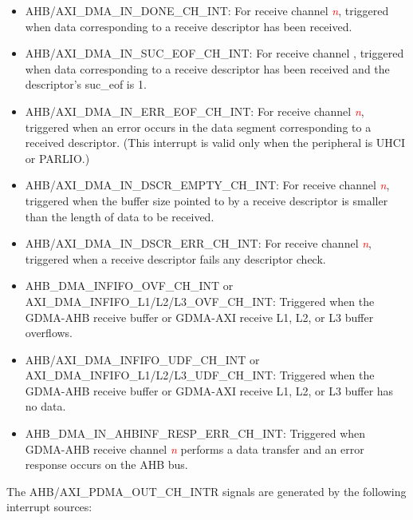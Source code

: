 \documentclass[main\_\_EN.tex]{subfiles}
\begin{document}
\begin{itemize}
    \item \label{int:GDMAINDONEINT}AHB/AXI\_DMA\_IN\_DONE\_CH\_INT: For receive channel \textcolor{red}{\it{n}}, triggered when data corresponding to a receive descriptor has been received.
    \item \label{int:GDMAINSUCEOFINT}AHB/AXI\_DMA\_IN\_SUC\_EOF\_CH\_INT: For receive channel , triggered when data corresponding to a receive descriptor has been received and the descriptor's suc\_eof is 1.
    \item \label{int:GDMAINERREOFINT}AHB/AXI\_DMA\_IN\_ERR\_EOF\_CH\_INT: For receive channel \textcolor{red}{\it{n}}, triggered when an error occurs in the data segment corresponding to a received descriptor. (This interrupt is valid only when the peripheral is UHCI or PARLIO.)
    \item \label{int:GDMAINDSCREMPTYINT}AHB/AXI\_DMA\_IN\_DSCR\_EMPTY\_CH\_INT: For receive channel \textcolor{red}{\it{n}}, triggered when the buffer size pointed to by a receive descriptor is smaller than the length of data to be received.
    \item \label{int:GDMAINDSCRERRINT}AHB/AXI\_DMA\_IN\_DSCR\_ERR\_CH\_INT: For receive channel \textcolor{red}{\it{n}}, triggered when a receive descriptor fails any descriptor check.
    \item \label{int:GDMAINFIFOOVFINT}AHB\_DMA\_INFIFO\_OVF\_CH\_INT or AXI\_DMA\_INFIFO\_L1/L2/L3\_OVF\_CH\_INT: Triggered when the GDMA-AHB receive buffer or GDMA-AXI receive L1, L2, or L3 buffer overflows.
    \item \label{int:GDMAINFIFOUDFINT}AHB/AXI\_DMA\_INFIFO\_UDF\_CH\_INT or AXI\_DMA\_INFIFO\_L1/L2/L3\_UDF\_CH\_INT: Triggered when the GDMA-AHB receive buffer or GDMA-AXI receive L1, L2, or L3 buffer has no data.
    \item \label{int:GDMAINAHBINFRESPERRINT}AHB\_DMA\_IN\_AHBINF\_RESP\_ERR\_CH\_INT: Triggered when GDMA-AHB receive channel \textcolor{red}{\it{n}} performs a data transfer and an error response occurs on the AHB bus.
\end{itemize}

The AHB/AXI\_PDMA\_OUT\_CH\_INTR signals are generated by the following interrupt sources:
\end{document}
